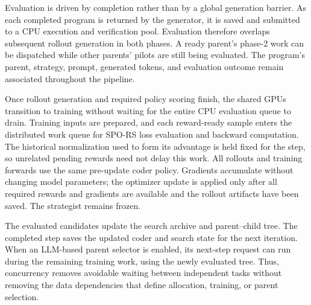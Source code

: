 \documentclass[10pt,letterpaper]{article}
\begin{document}
Evaluation is driven by completion rather than by a global generation
barrier. As each completed program is returned by the generator, it is saved
and submitted to a CPU execution and verification pool. Evaluation therefore
overlaps subsequent rollout generation in both phases. A ready parent's
phase-2 work can be dispatched while other parents' pilots are still being
evaluated. The program's parent, strategy, prompt, generated tokens, and
evaluation outcome remain associated throughout the pipeline.

Once rollout generation and required policy scoring finish, the shared
GPUs transition to training without waiting for the entire CPU evaluation
queue to drain. Training inputs are prepared, and each reward-ready sample
enters the distributed work queue for SPO-RS loss evaluation and backward
computation. The historical normalization used to form its advantage is
held fixed for the step, so unrelated pending rewards need not delay this
work. All rollouts and training forwards use the same pre-update coder
policy. Gradients accumulate without changing model parameters; the optimizer
update is applied only after all required rewards and gradients are available
and the rollout artifacts have been saved. The strategist remains frozen.

The evaluated candidates update the search archive and parent--child tree.
The completed step saves the updated coder and search state for the next
iteration. When an LLM-based parent selector is enabled, its next-step
request can run during the remaining training work, using the newly
evaluated tree. Thus, concurrency removes avoidable waiting between
independent tasks without removing the data dependencies that define
allocation, training, or parent selection.
\end{document}

